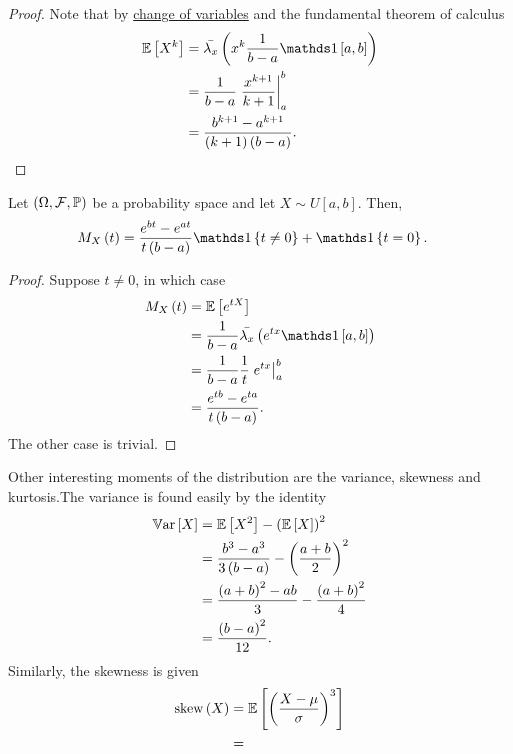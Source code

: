 \begin{proof}
Note that by \hyperref[cor:changeOfVariables]{change of variables}
and the fundamental theorem of calculus
\begin{align*}
\E\left[X^{k}\right] & =\lebInt{\lambda_{x}}{x^{k}\frac{1}{b-a}\indicate\left[a,b\right]}\\
 & =\frac{1}{b-a}\left.\frac{x^{k+1}}{k+1}\right|_{a}^{b}\\
 & =\frac{b^{k+1}-a^{k+1}}{(k+1)\left(b-a\right)}.
\end{align*}
\end{proof}
\begin{prop}
\label{prop:mgfUniformDistribution}Let $\left(\Omega,\mathcal{F},\mathbb{\mathbb{\mathbb{P}}}\right)$ be a
probability space and let $X\sim U\left[a,b\right]$. Then,
\begin{align*}
M_{X}\left(t\right) & =\frac{e^{bt}-e^{at}}{t\left(b-a\right)}\indicate\left\{ t\neq0\right\} +\indicate\left\{ t=0\right\} .
\end{align*}
\end{prop}

\begin{proof}
Suppose $t\neq0$, in which case
\begin{align*}
M_{X}\left(t\right) & =\E\left[e^{tX}\right]\\
 & =\frac{1}{b-a}\lebInt{\lambda_{x}}{e^{tx}\indicate\left[a,b\right]}\\
 & =\frac{1}{b-a}\frac{1}{t}\left.e^{tx}\right|_{a}^{b}\\
 & =\frac{e^{tb}-e^{ta}}{t\left(b-a\right)}.
\end{align*}
 The other case is trivial.
\end{proof}
Other interesting moments of the distribution are the variance, skewness
and kurtosis.The variance is found easily by the identity 
\begin{align*}
\mathbb{V\mathrm{ar}}\left[X\right] & =\mathbb{E}\left[X^{2}\right]-\left(\mathbb{E}\left[X\right]\right)^{2}\\
 & =\frac{b^{3}-a^{3}}{3\left(b-a\right)}-\left(\frac{a+b}{2}\right)^{2}\\
 & =\frac{\left(a+b\right)^{2}-ab}{3}-\frac{\left(a+b\right)^{2}}{4}\\
 & =\frac{\left(b-a\right)^{2}}{12}.
\end{align*}
Similarly, the skewness is given
\begin{align*}
\mathrm{skew}\left(X\right) & =\mathbb{E}\left[\left(\frac{X-\mu}{\sigma}\right)^{3}\right]\\
 & =
\end{align*}


